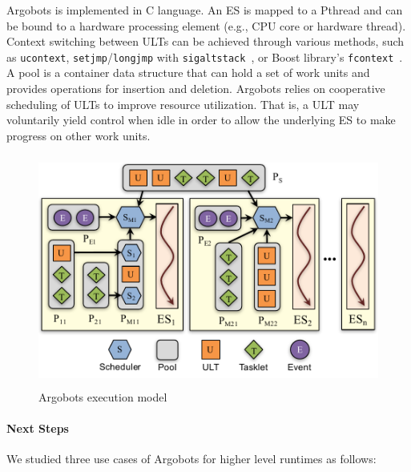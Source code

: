 Argobots is implemented in C language.  An ES is mapped to a Pthread
and can be bound to a hardware processing element (e.g., CPU core or
hardware thread).  Context switching between ULTs can be achieved
through various methods, such as \texttt{ucontext},
\texttt{setjmp}/\texttt{longjmp} with
\texttt{sigaltstack}~\cite{ATC00_Engelschall}, or Boost library's
\texttt{fcontext}~\cite{fcontext}. A pool is a container data
structure that can hold a set of work units and provides operations
for insertion and deletion. Argobots relies on cooperative scheduling
of ULTs to improve resource utilization. That is, a ULT may
voluntarily yield control when idle in order to allow the underlying
ES to make progress on other work units.

\begin{figure}[htb]
  \centering
  \includegraphics[height=3in]{projects/2.3.1-PMR/2.3.1.13-SOLLVE/SOLLVE-ARGOBOTS.pdf}
  \caption{\label{fig:sollve-argobots}Argobots execution model}
\end{figure}

\paragraph{Next Steps}

We studied three use cases of Argobots for higher level runtimes as
follows:


